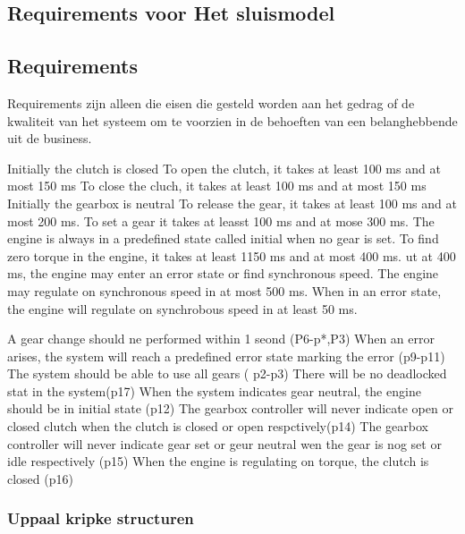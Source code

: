 {{{{{{{{{\subsection{Requirements voor Het sluismodel}

 
\subsection{Requirements}
Requirements zijn alleen die eisen die gesteld worden aan het gedrag of de kwaliteit van het systeem om te voorzien in de behoeften van een belanghebbende uit de business.



Initially the clutch is closed
To open the clutch, it takes at least 100 ms and at most 150 ms
To close the cluch, it takes at least 100 ms and at most 150 ms
Initially the gearbox is neutral
To release the gear, it takes at least 100 ms and at most 200 ms.
To set a gear it takes at leasst 100 ms and at mose 300 ms.
The engine is always in a predefined state called initial when no gear is set.
To find zero torque in the engine, it takes at least 1150 ms and at most 400 ms. ut at 400 ms, the engine may enter an error state or find synchronous speed.
The  engine may regulate on synchronous speed in at most 500 ms.
When in an error state, the engine will regulate on synchrobous speed in at least 50 ms.


A gear change should ne performed within 1 seond (P6-p*,P3)
When an error arises, the system will reach a predefined error state marking the error (p9-p11)
The system should be able to use all gears ( p2-p3)
There will be no deadlocked stat in the system(p17)
When the system indicates gear neutral, the engine should  be in initial state (p12)
The gearbox controller will never indicate open or closed clutch when the clutch is closed or open respctively(p14)
The gearbox controller will never indicate gear set or geur neutral wen the gear is nog set or idle respectively (p15)
When the engine is regulating on torque, the clutch is closed (p16)




\subsubsection{Uppaal kripke structuren}
















}}}}}}}}}
